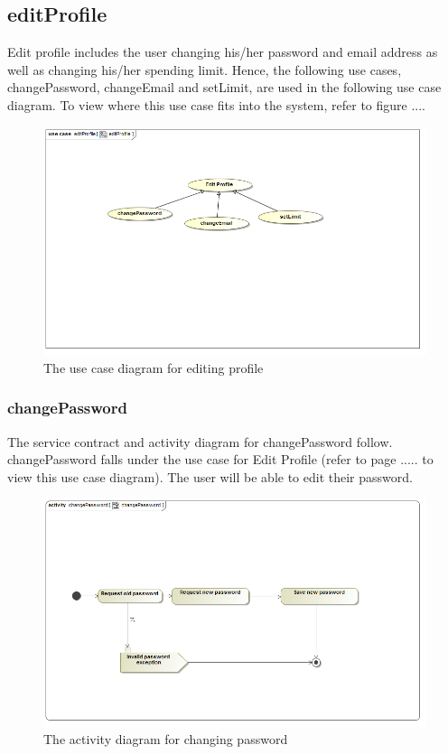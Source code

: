 \documentclass[a4paper,12pt]{article}
\begin{document}
\subsection{editProfile}
Edit profile includes the user changing his/her password and email address as well as changing his/her spending limit. Hence, the following use cases, changePassword, changeEmail and setLimit, are used in the following use case diagram. To view where this use case fits into the system, refer to figure .... 

\begin{figure}[H]
  \centering
    \includegraphics[width=1.0\textwidth]{images/editProfile.png}
    \caption{The use case diagram for editing profile} 
\end{figure}


\subsubsection{changePassword}
The service contract and activity diagram for changePassword follow. changePassword falls under the use case for Edit Profile (refer to page ..... to view this use case diagram). The user will be able to edit their password.
\begin{figure}[H]
  \centering
    \includegraphics[width=1.0\textwidth]{images/changePassword.png}
    \caption{The activity diagram for changing password } 
\end{figure}
	
\end{document}
